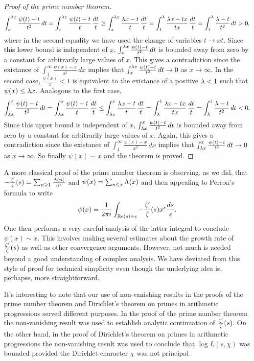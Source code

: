 \begin{proof}[Proof of the prime number theorem]
        \[
          \int_{x}^{\lambda x}\frac{\psi(t)-t}{t^{2}}\,dt = \int_{x}^{\lambda x}\frac{\psi(t)-t}{t}\,\frac{dt}{t} \ge \int_{x}^{\lambda x}\frac{\lambda x-t}{t}\,\frac{dt}{t} = \int_{1}^{\lambda}\frac{\lambda x-tx}{tx}\,\frac{dt}{t} = \int_{1}^{\lambda}\frac{\lambda-t}{t^{2}}\,dt > 0,
        \]
        where in the second equality we have used the change of variables $t \to xt$. Since this lower bound is independent of $x$, $\int_{x}^{\lambda x}\frac{\psi(t)-t}{t^{2}}\,dt$ is bounded away from zero by a constant for arbitrarily large values of $x$. This gives a contradiction since the existance of $\int_{1}^{\infty}\frac{\psi(x)-x}{x^{2}}\,dx$ implies that $\int_{x}^{\lambda x}\frac{\psi(t)-t}{t^{2}}\,dt \to 0$ as $x \to \infty$. In the second case, $\frac{\psi(x)}{x} < 1$ is equivalent to the existance of a positive $\lambda < 1$ such that $\psi(x) \le \lambda x$. Analogous to the first case,
        \[
          \int_{\lambda x}^{x}\frac{\psi(t)-t}{t^{2}}\,dt = \int_{\lambda x}^{x}\frac{\psi(t)-t}{t}\,\frac{dt}{t} \le \int_{\lambda x}^{x}\frac{\lambda x-t}{t}\,\frac{dt}{t} = \int_{\lambda}^{1}\frac{\lambda x-tx}{tx}\,\frac{dt}{t} = \int_{\lambda}^{1}\frac{\lambda-t}{t^{2}}\,dt < 0.
        \]
        Since this upper bound is independent of $x$, $\int_{\lambda x}^{x}\frac{\psi(t)-t}{t^{2}}\,dt$ is bounded away from zero by a constant for arbitrarily large values of $x$. Again, this gives a contradiction since the existance of $\int_{1}^{\infty}\frac{\psi(x)-x}{x^{2}}\,dx$ implies that $\int_{\lambda x}^{x}\frac{\psi(t)-t}{t^{2}}\,dt \to 0$ as $x \to \infty$. So finally $\psi(x) \sim x$ and the theorem is proved.
      \end{proof}

      A more classical proof of the prime number theorem is observing, as we did, that $-\frac{\zeta'}{\zeta}(s) = \sum_{n \ge 1}\frac{\Lambda(n)}{n^{s}}$ and $\psi(x) = \sum_{n \le x}\Lambda(x)$ and then appealing to Perron's formula to write
      \[
        \psi(x) = \frac{1}{2\pi i}\int_{\mathrm{Re}(s) = c}-\frac{\zeta'}{\zeta}(s)x^{s}\frac{ds}{s}.
      \]
      One then performs a very careful analysis of the latter integral to conclude $\psi(x) \sim x$. This involves making several estimates about the growth rate of $\frac{\zeta'}{\zeta}(s)$ as well as other convergence arguments. However, not much is needed beyond a good understanding of complex analysis. We have deviated from this style of proof for technical simplicity even though the underlying idea is, perhapse, more straightforward.

      \begin{remark}
        It's interesting to note that our use of non-vanishing results in the proofs of the prime number theorem and Dirichlet's theorem on primes in arithmetic progressions served different purposes. In the proof of the prime number theorem the non-vanishing result was used to establish analytic continuation of $\frac{\zeta'}{\zeta}(s)$. On the other hand, in the proof of Dirichlet's theorem on primes in arithmetic progressions the non-vanishing result was used to conclude that $\log L(s,\chi)$ was bounded provided the Dirichlet character $\chi$ was not principal.
      \end{remark}


